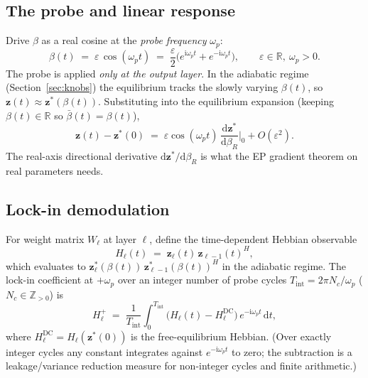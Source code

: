 \documentclass[11pt]{article}
\newcommand{\R}{\mathbb{R}}
\newcommand{\im}{\mathrm{i}}
\newcommand{\dd}{\mathrm{d}}
\theoremstyle{definition}
\begin{document}
\subsection{The probe and linear response}
Drive $\beta$ as a real cosine at the \emph{probe frequency} $\omega_p$:
\begin{equation}\label{eq:probe}
  \beta(t)
  \;=\;
  \varepsilon\,\cos(\omega_p t)
  \;=\;
  \frac{\varepsilon}{2}\bigl(e^{\im\omega_p t} + e^{-\im\omega_p t}\bigr),
  \qquad
  \varepsilon \in \R,\ \omega_p > 0.
\end{equation}
The probe is applied \emph{only at the output layer}.  In the
adiabatic regime (Section~\ref{sec:knobs}) the equilibrium tracks the
slowly varying $\beta(t)$, so $\bm{z}(t) \approx
\bm{z}^*(\beta(t))$.  Substituting into the equilibrium expansion
(keeping $\beta(t)\in\R$ so $\bar\beta(t)=\beta(t)$),
\begin{equation}\label{eq:linres-state}
  \bm{z}(t) - \bm{z}^*(0)
  \;=\;
  \varepsilon\cos(\omega_p t)\,
  \frac{\dd\bm{z}^*}{\dd\beta_R}\bigg|_0
  + O(\varepsilon^2).
\end{equation}
The real-axis directional derivative $\dd\bm{z}^*/\dd\beta_R$ is what
the EP gradient theorem on real parameters needs.

\subsection{Lock-in demodulation}
For weight matrix $W_\ell$ at layer $\ell$, define the time-dependent
Hebbian observable
\begin{equation}\label{eq:hebb-obs}
  H_\ell(t)
  \;=\;
  \bm{z}_\ell(t)\,\bm{z}_{\ell-1}(t)^H,
\end{equation}
which evaluates to $\bm{z}_\ell^*(\beta(t))\,\bm{z}_{\ell-1}^*(\beta(t))^H$
in the adiabatic regime.  The lock-in coefficient at $+\omega_p$ over
an integer number of probe cycles $T_\text{int} = 2\pi N_c/\omega_p$
($N_c \in \mathbb{Z}_{>0}$) is
\begin{equation}\label{eq:lockin-cont}
  H_\ell^{+}
  \;=\;
  \frac{1}{T_\text{int}}
  \int_0^{T_\text{int}}
  \bigl(H_\ell(t) - H_\ell^{\text{DC}}\bigr)\,
  e^{-\im\omega_p t}\,\dd t,
\end{equation}
where $H_\ell^{\text{DC}} = H_\ell(\bm{z}^*(0))$ is the free-equilibrium
Hebbian.  (Over exactly integer cycles any constant integrates against
$e^{-\im\omega_p t}$ to zero; the subtraction is a leakage/variance
reduction measure for non-integer cycles and finite arithmetic.)
\end{document}
